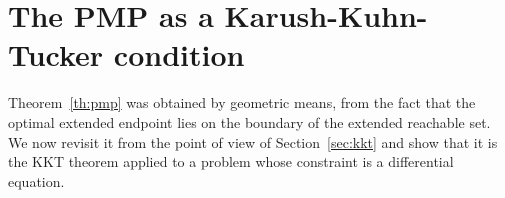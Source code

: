 

\section{The PMP as a Karush-Kuhn-Tucker condition}
\label{sec:pmp-lagrangian}

Theorem~\ref{th:pmp} was obtained by geometric means, from the fact that the optimal extended endpoint lies on the boundary of the extended reachable set. We now revisit it from the point of view of Section~\ref{sec:kkt} and show that it is the KKT theorem applied to a problem whose constraint is a differential equation.

